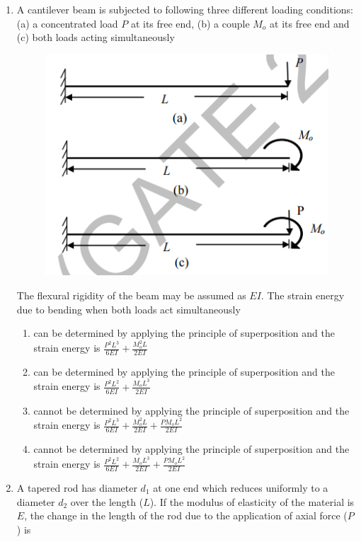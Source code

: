 \documentclass[a4paper,10pt]{article}
\begin{document}
\begin{enumerate}
    \item A cantilever beam is subjected to following three different loading conditions:
    (a) a concentrated load $P$ at its free end,
    (b) a couple $M_o$ at its free end and
    (c) both loads acting simultaneously
    \begin{figure}[H] \centering \includegraphics[width=0.4\columnwidth]{q15_solid.png} \caption*{} \label{fig:q15_solid} \end{figure}
    The flexural rigidity of the beam may be assumed as $EI$. The strain energy due to bending when both loads act simultaneously
    
    \hfill{}
    \begin{enumerate}[label=\Alph*)]
        \item can be determined by applying the principle of superposition and the strain energy is $\frac{P^2L^3}{6EI} + \frac{M_o^2 L}{2EI}$
        \item can be determined by applying the principle of superposition and the strain energy is $\frac{P^2L^2}{6EI} + \frac{M_o L^3}{2EI}$
        \item cannot be determined by applying the principle of superposition and the strain energy is $\frac{P^2L^3}{6EI} + \frac{M_o^2 L}{2EI} + \frac{P M_o L^2}{2EI}$
        \item cannot be determined by applying the principle of superposition and the strain energy is $\frac{P^2L^2}{6EI} + \frac{M_o L^3}{2EI} + \frac{P M_o L^2}{2EI}$
    \end{enumerate}
    
    \item A tapered rod has diameter $d_1$ at one end which reduces uniformly to a diameter $d_2$ over the length ($L$). If the modulus of elasticity of the material is $E$, the change in the length of the rod due to the application of axial force ($P$) is
    
    \hfill{}
    \begin{enumerate}[label=\Alph*)]
    \end{enumerate}
    

\end{enumerate}
\end{document}
